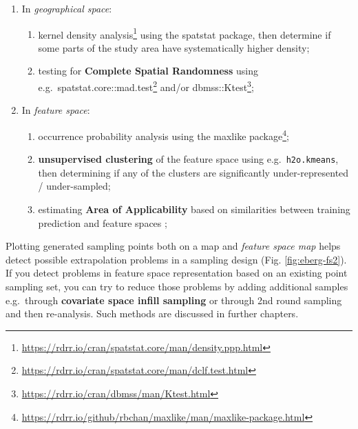\documentclass[
  graybox,natbib,nospthms]{svmono}
\providecommand{\tightlist}{%
  \setlength{\itemsep}{0pt}\setlength{\parskip}{0pt}}
\providecommand{\tightlist}{\setlength{\itemsep}{0pt}\setlength{\parskip}{0pt}}
\renewcommand{\href}[2]{#2 (\url{#1})}
\renewcommand{\href}[2]{#2\footnote{\url{#1}}}
\begin{document}
\begin{enumerate}
\def\labelenumi{\arabic{enumi}.}
\tightlist
\item
  In \emph{geographical space}:

  \begin{enumerate}
  \def\labelenumii{(\alph{enumii})}
  \tightlist
  \item
    \href{https://rdrr.io/cran/spatstat.core/man/density.ppp.html}{kernel density analysis} using the spatstat package, then determine if some parts of the study area have systematically higher density;\\
  \item
    testing for \textbf{Complete Spatial Randomness} \citep{schabenberger2005statistical} using e.g.~\href{https://rdrr.io/cran/spatstat.core/man/dclf.test.html}{spatstat.core::mad.test} and/or \href{https://rdrr.io/cran/dbmss/man/Ktest.html}{dbmss::Ktest};\\
  \end{enumerate}
\item
  In \emph{feature space}:

  \begin{enumerate}
  \def\labelenumii{(\alph{enumii})}
  \tightlist
  \item
    occurrence probability analysis using the \href{https://rdrr.io/github/rbchan/maxlike/man/maxlike-package.html}{maxlike package};
  \item
    \textbf{unsupervised clustering} of the feature space using e.g.~\texttt{h2o.kmeans}, then determining if
    any of the clusters are significantly under-represented / under-sampled;\\
  \item
    estimating \textbf{Area of Applicability} based on similarities between training
    prediction and feature spaces \citep{meyer2021predicting};
  \end{enumerate}
\end{enumerate}

Plotting generated sampling points both on a map and \emph{feature space map} helps
detect possible extrapolation problems in a sampling design (Fig. \ref{fig:eberg-fs2}).
If you detect problems in feature space representation based on an existing point
sampling set, you can try to reduce those problems by adding additional samples e.g.~through
\textbf{covariate space infill sampling} \citep{Brus2021sampling} or through 2nd round
sampling and then re-analysis. Such methods are discussed in further chapters.
\end{document}
